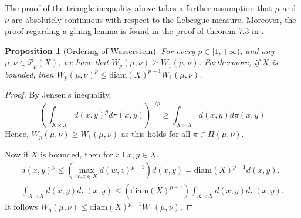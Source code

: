 \documentclass[12pt]{article}
\theoremstyle{plain}
\newtheorem{prop}{Proposition}[section]
\numberwithin{equation}{section}
\begin{document}
The proof of the triangle inequality above takes a further assumption that $\mu$ and $\nu$ are absolutely continuous with respect to the Lebesgue measure.
Moreover, the proof regarding a gluing lemma is found in the proof of theorem 7.3 in \cite{villani}.
\begin{prop}[Ordering of Wasserstein]
  For every $p\in [1,+\infty)$, and any $\mu,\nu\in \mathcal{P}_p(X)$, we have that $W_p(\mu,\nu) \ge W_1(\mu,\nu)$. Furthermore, if $X$ is bounded, then $W_p(\mu,\nu)^p \le \text{diam}(X)^{p-1}W_1(\mu,\nu)$.
\end{prop}
\begin{proof}
  By Jensen's inequality,
  \begin{equation*}
    \left(\int_{X\times X} d(x,y)^pd\pi(x,y)\right)^{1/p} \ge \int_{X\times X} d(x,y)d\pi(x,y)
  \end{equation*}
  Hence, $W_p(\mu,\nu) \ge W_1(\mu,\nu)$ as this holds for all $\pi\in \Pi(\mu,\nu)$.

  Now if $X$ is bounded, then for all $x,y\in X$,
  \begin{align*}
    d(x,y)^p \le (\max_{w,z\in X} d(w,z)^{p-1})d(x,y) = \text{diam}(X)^{p-1}d(x,y). \\
    \int_{X\times X} d(x,y)d\pi(x,y)\le (\text{diam}(X)^{p-1})\int_{X\times X}d(x,y)d\pi(x,y).
  \end{align*}
  It follows $W_p(\mu,\nu) \le \text{diam}(X)^{p-1}W_1(\mu,\nu).$
\end{proof}
\end{document}
